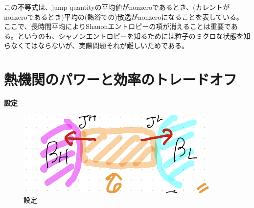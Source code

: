 \documentclass[a4paper,11pt]{jsarticle}
\numberwithin{equation}{section}
\begin{document}
この不等式は、jump quantityの平均値がnonzeroであるとき、(カレントがnonzeroであるとき)平均の(熱浴での)散逸がnonzeroになることを表している。\\
ここで、長時間平均によりShanonエントロピーの項が消えることは重要である。というのも、シャノンエントロピーを知るためには粒子のミクロな状態を知らなくてはならないが、実際問題それが難しいためである。

\section{熱機関のパワーと効率のトレードオフ}
\textbf{設定}\\
\begin{figure}[H]
    \begin{center}
    \includegraphics[width=100mm]{set.png}
    \end{center}
    \caption{設定}
    \label{fig:set}
\end{figure}
\end{document}
